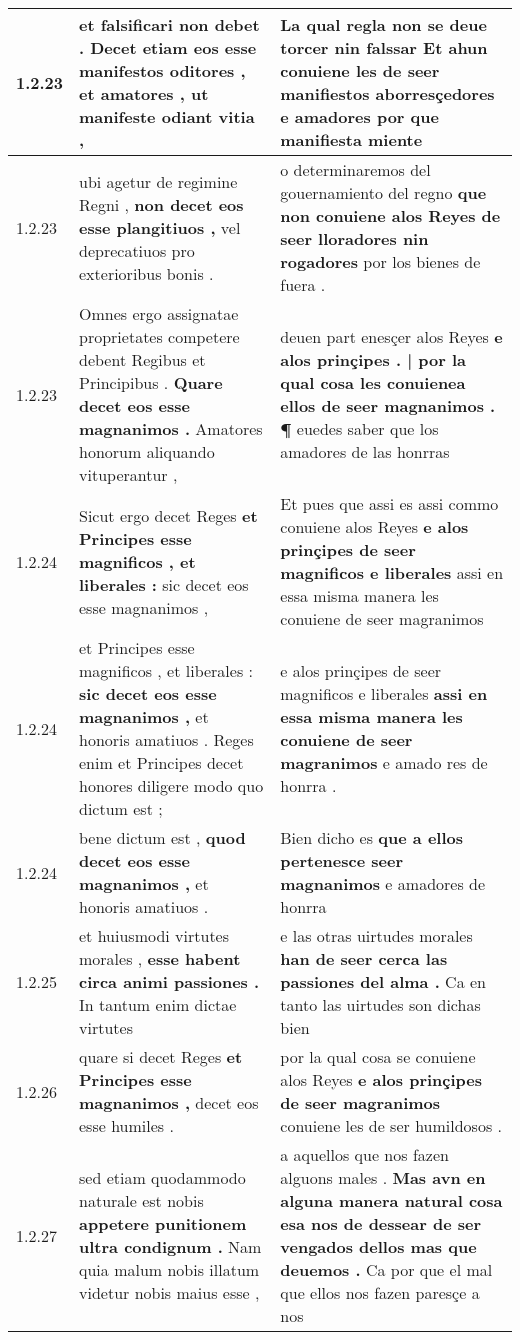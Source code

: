 \begin{tabular}{|p{1cm}|p{6.5cm}|p{6.5cm}|}
1.2.23 & et falsificari non debet . \textbf{ Decet etiam eos esse manifestos oditores , et amatores , } ut manifeste odiant vitia , & La qual regla non se deue torcer nin falssar \textbf{ Et ahun conuiene les de seer manifiestos aborresçedores e amadores } por que manifiesta miente \\\hline
1.2.23 & ubi agetur de regimine Regni , \textbf{ non decet eos esse plangitiuos , } vel deprecatiuos pro exterioribus bonis . & o determinaremos del gouernamiento del regno \textbf{ que non conuiene alos Reyes de seer lloradores nin rogadores } por los bienes de fuera . \\\hline
1.2.23 & Omnes ergo assignatae proprietates competere debent Regibus et Principibus . \textbf{ Quare decet eos esse magnanimos . } Amatores honorum aliquando vituperantur , & deuen part enesçer alos Reyes \textbf{ e alos prinçipes . | por la qual cosa les conuienea ellos de seer magnanimos . ¶ } euedes saber que los amadores de las honrras \\\hline
1.2.24 & Sicut ergo decet Reges \textbf{ et Principes esse magnificos , et liberales : } sic decet eos esse magnanimos , & Et pues que assi es assi commo conuiene alos Reyes \textbf{ e alos prinçipes de seer magnificos e liberales } assi en essa misma manera les conuiene de seer magranimos \\\hline
1.2.24 & et Principes esse magnificos , et liberales : \textbf{ sic decet eos esse magnanimos , } et honoris amatiuos . Reges enim et Principes decet honores diligere modo quo dictum est ; & e alos prinçipes de seer magnificos e liberales \textbf{ assi en essa misma manera les conuiene de seer magranimos } e amado res de honrra . \\\hline
1.2.24 & bene dictum est , \textbf{ quod decet eos esse magnanimos , } et honoris amatiuos . & Bien dicho es \textbf{ que a ellos pertenesce seer magnanimos } e amadores de honrra \\\hline
1.2.25 & et huiusmodi virtutes morales , \textbf{ esse habent circa animi passiones . } In tantum enim dictae virtutes & e las otras uirtudes morales \textbf{ han de seer cerca las passiones del alma . } Ca en tanto las uirtudes son dichas bien \\\hline
1.2.26 & quare si decet Reges \textbf{ et Principes esse magnanimos , } decet eos esse humiles . & por la qual cosa se conuiene alos Reyes \textbf{ e alos prinçipes de seer magranimos } conuiene les de ser humildosos . \\\hline
1.2.27 & sed etiam quodammodo naturale est nobis \textbf{ appetere punitionem ultra condignum . } Nam quia malum nobis illatum videtur nobis maius esse , & a aquellos que nos fazen alguons males . \textbf{ Mas avn en alguna manera natural cosa esa nos de dessear de ser vengados dellos mas que deuemos . } Ca por que el mal que ellos nos fazen paresçe a nos \\\hline

\end{tabular}
